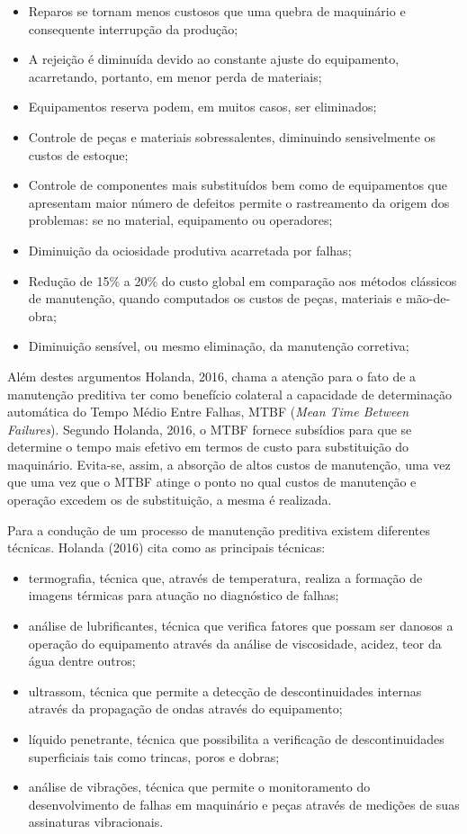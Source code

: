 \documentclass[
	12pt,				
	oneside,			
	a4paper,			
	english,			
	brazil,			
	]{abntex2ppgsi}
\begin{document}
\begin{itemize}
	\item Reparos se tornam menos custosos que uma quebra de maquinário e consequente interrupção da produção;
	\item A rejeição é diminuída devido ao constante ajuste do equipamento, acarretando, portanto, em menor perda de materiais;
	\item Equipamentos reserva podem, em muitos casos, ser eliminados;
	\item Controle de peças e materiais sobressalentes, diminuindo sensivelmente os custos de estoque;
	\item Controle de componentes mais substituídos bem como de equipamentos que apresentam maior número de defeitos permite o rastreamento da origem dos problemas: se no material, equipamento ou operadores;
	\item Diminuição da ociosidade produtiva acarretada por falhas;
	\item Redução de 15\% a 20\% do custo global em comparação aos métodos clássicos de manutenção, quando computados os custos de peças, materiais e mão-de-obra;
	\item Diminuição sensível, ou mesmo eliminação, da manutenção corretiva;
\end{itemize}

Além destes argumentos Holanda, 2016, chama a atenção para o fato de a manutenção preditiva ter como benefício colateral a capacidade de determinação automática do Tempo Médio Entre Falhas, MTBF (\textit{Mean Time Between Failures}). Segundo Holanda, 2016, o MTBF fornece subsídios para que se determine o tempo mais efetivo em termos de custo para substituição do maquinário. Evita-se, assim, a absorção de altos custos de manutenção, uma vez que uma vez que o MTBF atinge o ponto no qual custos de manutenção e operação excedem os de substituição, a mesma é realizada. 

Para a condução de um processo de manutenção preditiva existem diferentes técnicas. Holanda (2016) cita como as principais técnicas: 
\begin{itemize}
	\item termografia, técnica que, através de temperatura, realiza a formação de imagens térmicas para atuação no diagnóstico de falhas; 
	\item análise de lubrificantes, técnica que verifica fatores que possam ser danosos a operação do equipamento através da análise de viscosidade, acidez, teor da água dentre outros; 
	\item ultrassom, técnica que permite a detecção de descontinuidades internas através da propagação de ondas através do equipamento; 
	\item líquido penetrante, técnica que possibilita a verificação de descontinuidades superficiais tais como trincas, poros e dobras; 
	\item análise de vibrações, técnica que permite o monitoramento do desenvolvimento de falhas em maquinário e peças através de medições de suas assinaturas vibracionais. 
\end{itemize}
\end{document}
